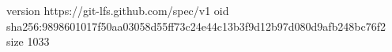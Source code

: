 version https://git-lfs.github.com/spec/v1
oid sha256:9898601017f50aa03058d55ff73c24e44c13b3f9d12b97d080d9afb248bc76f2
size 1033
